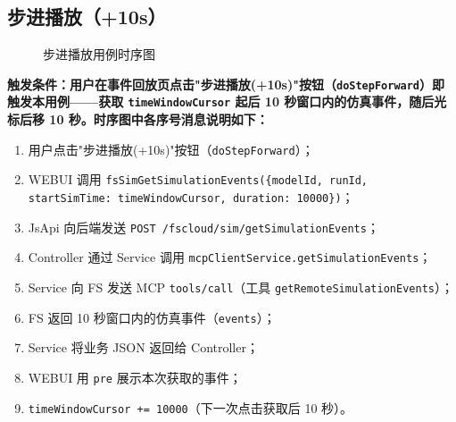 \subsection{步进播放（+10s）}
\begin{figure}[!h]
	\centering
	\resizebox{1.0\linewidth}{!}{}
	\caption{步进播放用例时序图}\label{fig:stepForward}
\end{figure}
\bf{触发条件}：用户在事件回放页点击"步进播放(+10s)"按钮（\texttt{doStepForward}）即触发本用例——获取 \texttt{timeWindowCursor} 起后 10 秒窗口内的仿真事件，随后光标后移 10 秒。时序图中各序号消息说明如下：
\begin{enumerate}[label=\arabic*)]
	\item 用户点击"步进播放(+10s)"按钮（\texttt{doStepForward}）；
	\item WEBUI 调用 \texttt{fsSimGetSimulationEvents(\{modelId, runId, startSimTime: timeWindowCursor, duration: 10000\})}；
	\item JsApi 向后端发送 \texttt{POST /fscloud/sim/getSimulationEvents}；
	\item Controller 通过 Service 调用 \texttt{mcpClientService.getSimulationEvents}；
	\item Service 向 FS 发送 MCP \texttt{tools/call}（工具 \texttt{getRemoteSimulationEvents}）；
	\item FS 返回 10 秒窗口内的仿真事件（\texttt{events}）；
	\item Service 将业务 JSON 返回给 Controller；
	\item WEBUI 用 \texttt{pre} 展示本次获取的事件；
	\item \texttt{timeWindowCursor += 10000}（下一次点击获取后 10 秒）。
\end{enumerate}
\newpage
